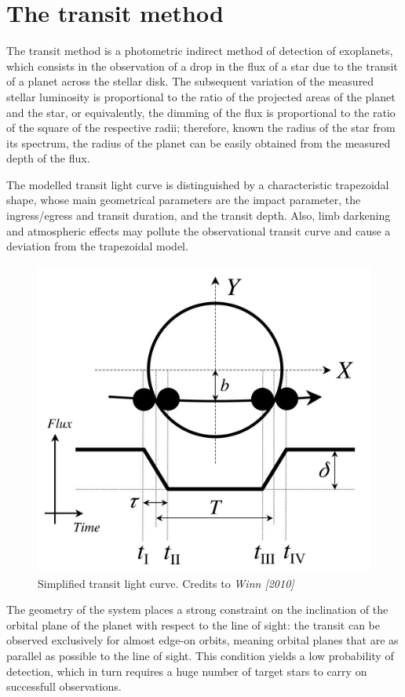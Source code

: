 \documentclass{aa}
\begin{document}
\section{The transit method }

The transit method is a photometric indirect method of detection of exoplanets, which consists in the observation of a drop in the flux of a star due to the transit of a planet across the stellar disk. 
The subsequent variation of the measured stellar luminosity is proportional to the ratio of the projected areas of the planet and the star, or equivalently, the dimming of the flux is proportional to the ratio of the square of the respective radii; therefore, known the radius of the star from its spectrum, the radius of the planet can be easily obtained from the measured depth of the flux. 

The modelled transit light curve is distinguished by a characteristic trapezoidal shape, whose main geometrical parameters are the impact parameter, the ingress/egress and transit duration, and the transit depth. Also, limb darkening and atmospheric effects may pollute the observational transit curve and cause a deviation from the trapezoidal model.
\begin{figure}[h]
    \centering  
    \includegraphics[scale=0.18, angle=0]{pictures/transit.jpeg}
    \caption{Simplified transit light curve. Credits to \textit{Winn [2010]}}
\end{figure}
The geometry of the system places a strong constraint on the inclination of the orbital plane of the planet with respect to the line of sight: the transit can be observed exclusively for almost edge-on orbits, meaning orbital planes that 
are as parallel as possible to the line of sight. This condition yields a low probability of detection, which in turn requires a huge number of target stars to carry on successfull observations. 
\end{document}
